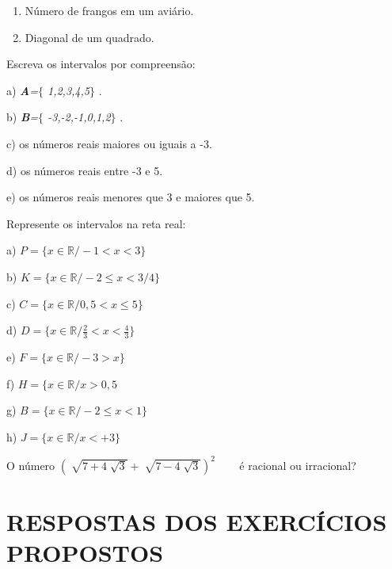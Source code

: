 \begin{exercicios}
\begin{enumerate}[label=\alph*)]
    \item Número de frangos em um aviário.

    \item Diagonal de um quadrado.
\end{enumerate}
	\exitem{} Escreva os intervalos por compreensão:
	\begin{multicols}{2}
	
		a) \textbf{\textit{A}}\textit{=$ \{ $ 1,2,3,4,5$ \} $ }.
		
		b) \textbf{\textit{B}}\textit{=$ \{ $ -3,-2,-1,0,1,2$ \} $ }.

		c) os números reais maiores ou iguais a -3.
		
		d) os números reais entre -3 e 5.

		e) os números reais menores que 3 e maiores que 5.
	\end{multicols}

	\exitem{}  Represente os intervalos na reta real:
	\begin{multicols}{2}
	a) $P= \{ x \in {\mathbb{R} }/ -  1 < x < 3 \} $
	 
	b) $K= \{ x \in \mathbb{R} / - 2 \leq x < 3/4 \} $ 

	c) $C= \{ x \in \mathbb{R} /0, 5 < x \leq  5 \} $
	
	d) $D= \{ x \in \mathbb{R} / \frac{2}{3} < x < \frac{4}{3} \} $ 

	e) $F= \{ x \in \mathbb{R}/ - 3 > x \} $
	
	f) $H = \{ x \in \mathbb{R}/ x > 0, 5$ 

	g) $B= \{ x \in \mathbb{R} / - 2 \leq x < 1 \} $
	
	h) $J= \{ x \in \mathbb{R} / x < +3 \} $ 
\end{multicols}
	\exitem{} O número \(  \left( \sqrt[]{7+4\sqrt[]{3}}+\sqrt[]{7-4\sqrt[]{3}} \right) ^{2} \) ~~~ é racional ou irracional?
\end{exercicios}

\section{RESPOSTAS DOS EXERCÍCIOS PROPOSTOS}

